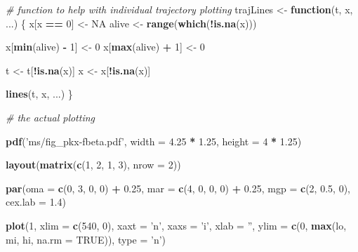 \documentclass[]{article}
\newenvironment{Shaded}{\begin{snugshade}}{\end{snugshade}}
\newcommand{\KeywordTok}[1]{\textcolor[rgb]{0.13,0.29,0.53}{\textbf{#1}}}
\newcommand{\DataTypeTok}[1]{\textcolor[rgb]{0.13,0.29,0.53}{#1}}
\newcommand{\DecValTok}[1]{\textcolor[rgb]{0.00,0.00,0.81}{#1}}
\newcommand{\FloatTok}[1]{\textcolor[rgb]{0.00,0.00,0.81}{#1}}
\newcommand{\StringTok}[1]{\textcolor[rgb]{0.31,0.60,0.02}{#1}}
\newcommand{\CommentTok}[1]{\textcolor[rgb]{0.56,0.35,0.01}{\textit{#1}}}
\newcommand{\OtherTok}[1]{\textcolor[rgb]{0.56,0.35,0.01}{#1}}
\newcommand{\ControlFlowTok}[1]{\textcolor[rgb]{0.13,0.29,0.53}{\textbf{#1}}}
\newcommand{\OperatorTok}[1]{\textcolor[rgb]{0.81,0.36,0.00}{\textbf{#1}}}
\newcommand{\NormalTok}[1]{#1}
\begin{document}
\begin{Shaded}
\begin{Highlighting}[]
{\CommentTok{# function to help with individual trajectory plotting}
\NormalTok{trajLines <-}\StringTok{ }\ControlFlowTok{function}\NormalTok{(t, x, ...) \{}
\NormalTok{    x[x }\OperatorTok{==}\StringTok{ }\DecValTok{0}\NormalTok{] <-}\StringTok{ }\OtherTok{NA}
\NormalTok{    alive <-}\StringTok{ }\KeywordTok{range}\NormalTok{(}\KeywordTok{which}\NormalTok{(}\OperatorTok{!}\KeywordTok{is.na}\NormalTok{(x)))}
    
\NormalTok{    x[}\KeywordTok{min}\NormalTok{(alive) }\OperatorTok{-}\StringTok{ }\DecValTok{1}\NormalTok{] <-}\StringTok{ }\DecValTok{0}
\NormalTok{    x[}\KeywordTok{max}\NormalTok{(alive) }\OperatorTok{+}\StringTok{ }\DecValTok{1}\NormalTok{] <-}\StringTok{ }\DecValTok{0}
    
\NormalTok{    t <-}\StringTok{ }\NormalTok{t[}\OperatorTok{!}\KeywordTok{is.na}\NormalTok{(x)]}
\NormalTok{    x <-}\StringTok{ }\NormalTok{x[}\OperatorTok{!}\KeywordTok{is.na}\NormalTok{(x)]}
    
    \KeywordTok{lines}\NormalTok{(t, x, ...)}
\NormalTok{\}}

\CommentTok{# the actual plotting}

\KeywordTok{pdf}\NormalTok{(}\StringTok{'ms/fig_pkx-fbeta.pdf'}\NormalTok{, }\DataTypeTok{width =} \FloatTok{4.25} \OperatorTok{*}\StringTok{ }\FloatTok{1.25}\NormalTok{, }\DataTypeTok{height =} \DecValTok{4} \OperatorTok{*}\StringTok{ }\FloatTok{1.25}\NormalTok{)}

\KeywordTok{layout}\NormalTok{(}\KeywordTok{matrix}\NormalTok{(}\KeywordTok{c}\NormalTok{(}\DecValTok{1}\NormalTok{, }\DecValTok{2}\NormalTok{, }\DecValTok{1}\NormalTok{, }\DecValTok{3}\NormalTok{), }\DataTypeTok{nrow =} \DecValTok{2}\NormalTok{))}

\KeywordTok{par}\NormalTok{(}\DataTypeTok{oma =} \KeywordTok{c}\NormalTok{(}\DecValTok{0}\NormalTok{, }\DecValTok{3}\NormalTok{, }\DecValTok{0}\NormalTok{, }\DecValTok{0}\NormalTok{) }\OperatorTok{+}\StringTok{ }\FloatTok{0.25}\NormalTok{, }\DataTypeTok{mar =} \KeywordTok{c}\NormalTok{(}\DecValTok{4}\NormalTok{, }\DecValTok{0}\NormalTok{, }\DecValTok{0}\NormalTok{, }\DecValTok{0}\NormalTok{) }\OperatorTok{+}\StringTok{ }\FloatTok{0.25}\NormalTok{, }
    \DataTypeTok{mgp =} \KeywordTok{c}\NormalTok{(}\DecValTok{2}\NormalTok{, }\FloatTok{0.5}\NormalTok{, }\DecValTok{0}\NormalTok{), }\DataTypeTok{cex.lab =} \FloatTok{1.4}\NormalTok{)}

\KeywordTok{plot}\NormalTok{(}\DecValTok{1}\NormalTok{, }\DataTypeTok{xlim =} \KeywordTok{c}\NormalTok{(}\DecValTok{540}\NormalTok{, }\DecValTok{0}\NormalTok{), }\DataTypeTok{xaxt =} \StringTok{'n'}\NormalTok{, }\DataTypeTok{xaxs =} \StringTok{'i'}\NormalTok{, }\DataTypeTok{xlab =} \StringTok{''}\NormalTok{, }
     \DataTypeTok{ylim =} \KeywordTok{c}\NormalTok{(}\DecValTok{0}\NormalTok{, }\KeywordTok{max}\NormalTok{(lo, mi, hi, }\DataTypeTok{na.rm =} \OtherTok{TRUE}\NormalTok{)), }\DataTypeTok{type =} \StringTok{'n'}\NormalTok{)}

}
\end{Highlighting}
\end{Shaded}
\end{document}
